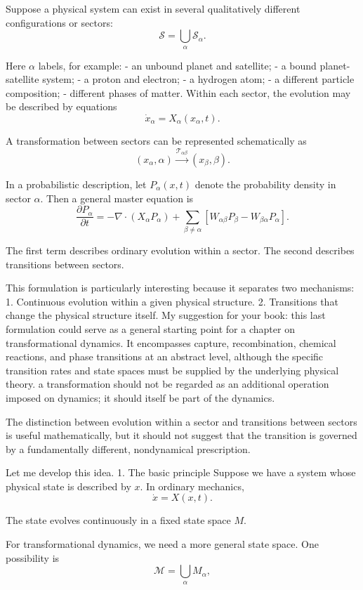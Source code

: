 Suppose a physical system can exist in several qualitatively different configurations or sectors:
\[
\mathcal S=\bigcup_{\alpha}\mathcal S_\alpha.
\]

Here \(\alpha\) labels, for example:
- an unbound planet and satellite;
- a bound planet-satellite system;
- a proton and electron;
- a hydrogen atom;
- a different particle composition;
- different phases of matter.
Within each sector, the evolution may be described by equations
\[
\dot x_\alpha=X_\alpha(x_\alpha,t).
\]

A transformation between sectors can be represented schematically as
\[
(x_\alpha,\alpha)
\xrightarrow{\mathcal T_{\alpha\beta}}
(x_\beta,\beta).
\]

In a probabilistic description, let \(P_\alpha(x,t)\) denote the probability density in sector \(\alpha\). Then a general master equation is
\[
\boxed{
\frac{\partial P_\alpha}{\partial t}
=
-\nabla\cdot(X_\alpha P_\alpha)
+
\sum_{\beta\ne\alpha}
\left[
W_{\alpha\beta}P_\beta
-
W_{\beta\alpha}P_\alpha
\right].
}
\]

The first term describes ordinary evolution within a sector. The second describes transitions between sectors.

This formulation is particularly interesting because it separates two mechanisms:
1. Continuous evolution within a given physical structure.
2. Transitions that change the physical structure itself.
My suggestion for your book: this last formulation could serve as a general starting point for a chapter on transformational dynamics. It encompasses capture, recombination, chemical reactions, and phase transitions at an abstract level, although the specific transition rates and state spaces must be supplied by the underlying physical theory.
a transformation should not be regarded as an additional operation imposed on dynamics; it should itself be part of the dynamics.

The distinction between evolution within a sector and transitions between sectors is useful mathematically, but it should not suggest that the transition is governed by a fundamentally different, nondynamical prescription.

Let me develop this idea.
1. The basic principle
Suppose we have a system whose physical state is described by \(x\). In ordinary mechanics,
\[
\dot x=X(x,t).
\]

The state evolves continuously in a fixed state space \(M\).

For transformational dynamics, we need a more general state space. One possibility is
\[
\mathcal M=\bigcup_{\alpha}M_\alpha,
\]

